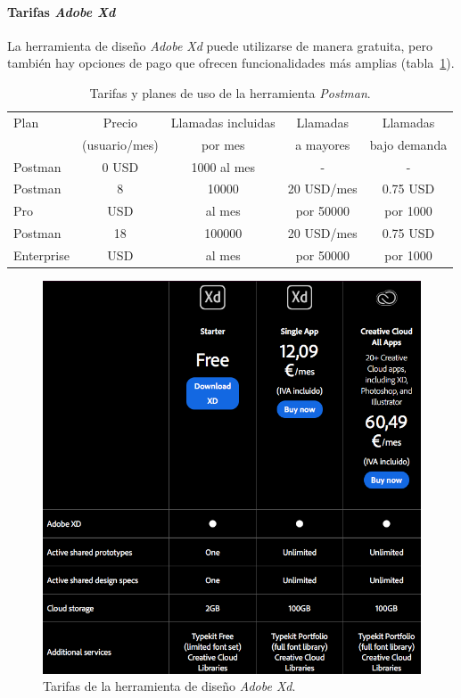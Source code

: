 \paragraph{Tarifas \textit{Adobe Xd}}
La herramienta de diseño \textit{Adobe Xd} puede utilizarse de manera gratuita, pero también hay opciones de pago que ofrecen funcionalidades más amplias (tabla~\ref{fig:adobe_pricing}).

\begin{table}[t]
\begin{center}
\small
\begin{tabular}{|l|c|c|c|c|}
\hline 
Plan & Precio & Llamadas incluidas & Llamadas & Llamadas\\
& (usuario/mes) & por mes & a mayores & bajo demanda\\ \hline \hline
Postman & 0 USD & 1000 al mes & - & - \\ \hline
Postman & 8 & 10000 & 20 USD/mes & 0.75 USD\\
Pro & USD & al mes & por 50000 &  por 1000\\ \hline
Postman & 18 & 100000 & 20 USD/mes & 0.75 USD\\ 
Enterprise & USD & al mes & por 50000 & por 1000 \\ \hline
\end{tabular}
\caption{Tarifas y planes de uso de la herramienta \textit{Postman}.}
\label{fig:postman_pricing}
\end{center}
\end{table}

\begin{figure}[t]
\centering
\includegraphics[scale=0.45]{figures/adobe-pricing.png}
\caption{Tarifas de la herramienta de diseño \textit{Adobe Xd}.
\label{fig:adobe_pricing}}
\end{figure}

